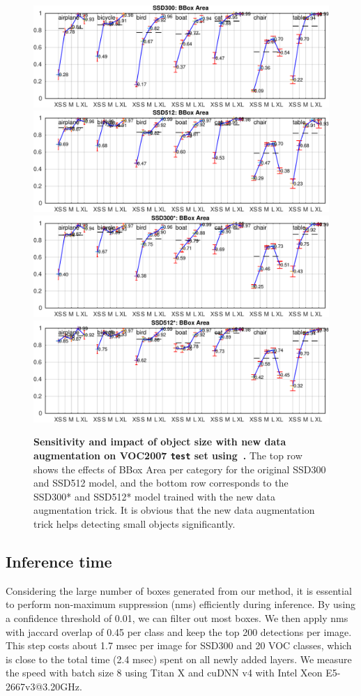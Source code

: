 \documentclass[runningheads]{llncs}
\begin{document}
\begin{figure}[htbp]
	\centering
    \includegraphics[width=0.495\linewidth]{figure/300_plots_area_strong}
    \includegraphics[width=0.495\linewidth]{figure/512_plots_area_strong}\\
    \includegraphics[width=0.495\linewidth]{figure/300_plots_area_strong_new}
    \includegraphics[width=0.495\linewidth]{figure/512_plots_area_strong_new}\\
    \caption{\textbf{Sensitivity and impact of object size with new data augmentation on VOC2007 \texttt{test} set using~\cite{hoiem2012diagnosing}.} The top row shows the effects of BBox Area per category for the original SSD300 and SSD512 model, and the bottom row corresponds to the SSD300* and SSD512* model trained with the new data augmentation trick. It is obvious that the new data augmentation trick helps detecting small objects significantly.}
    \label{fig:sensitivityanalysisnew}
\end{figure}

\subsection{Inference time}
Considering the large number of boxes generated from our method, it is essential to perform non-maximum suppression (nms) efficiently during inference. By using a confidence threshold of 0.01, we can filter out most boxes. We then apply nms with jaccard overlap of 0.45 per class and keep the top 200 detections per image. This step costs about 1.7 msec per image for SSD300 and 20 VOC classes, which is close to the total time (2.4 msec) spent on all newly added layers. We measure the speed with batch size 8 using Titan X and cuDNN v4 with Intel Xeon E5-2667v3@3.20GHz.
\end{document}
